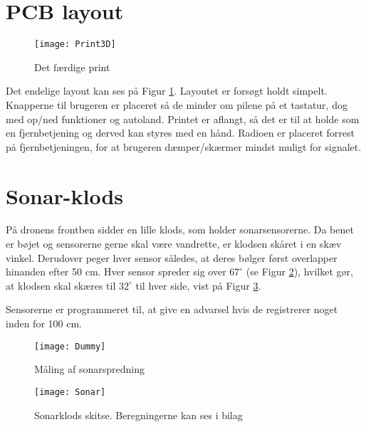 \documentclass[Main]{subfiles}
\begin{document}
\section{PCB layout}

\begin{figure}[H]
\centering
\texttt{[image: Print3D]}
\caption{Det færdige print}
\label{fig: Print3D}
\end{figure}
Det endelige layout kan ses på Figur \ref{fig: Print3D}.
Layoutet er forsøgt holdt simpelt. 
Knapperne til brugeren er placeret så de minder om pilene på et tastatur, dog med op/ned funktioner og autoland.
Printet er aflangt, så det er til at holde som en fjernbetjening og derved kan styres med en hånd.
Radioen er placeret forrest på fjernbetjeningen, for at brugeren dæmper/skærmer mindst muligt for signalet.  



\section{Sonar-klods}\label{Sec:Sonar}
På dronens frontben sidder en lille klods, som holder sonarsensorerne.
Da benet er bøjet og sensorerne gerne skal være vandrette, er klodsen skåret i en skæv vinkel.
Derudover peger hver sensor således, at deres bølger først overlapper hinanden efter 50 cm.
Hver sensor spreder sig over $67^\circ$ (se Figur \ref{Fig:SonarMeasure}), hvilket gør, at klodsen skal skæres til $32^\circ$ til hver side, vist på Figur \ref{Fig:SonarSkitse}.

Sensorerne er programmeret til, at give en advarsel hvis de registrerer noget inden for 100 cm.

\begin{figure}[H]
\centering
	\texttt{[image: Dummy]}
	\caption{Måling af sonarspredning}
	\label{Fig:SonarMeasure}
\end{figure}

\begin{figure}[H]
\centering
	\texttt{[image: Sonar]}
	\caption{Sonarklods skitse. Beregningerne kan ses i bilag\cite{Klods}}
	\label{Fig:SonarSkitse}
\end{figure}
\end{document}

